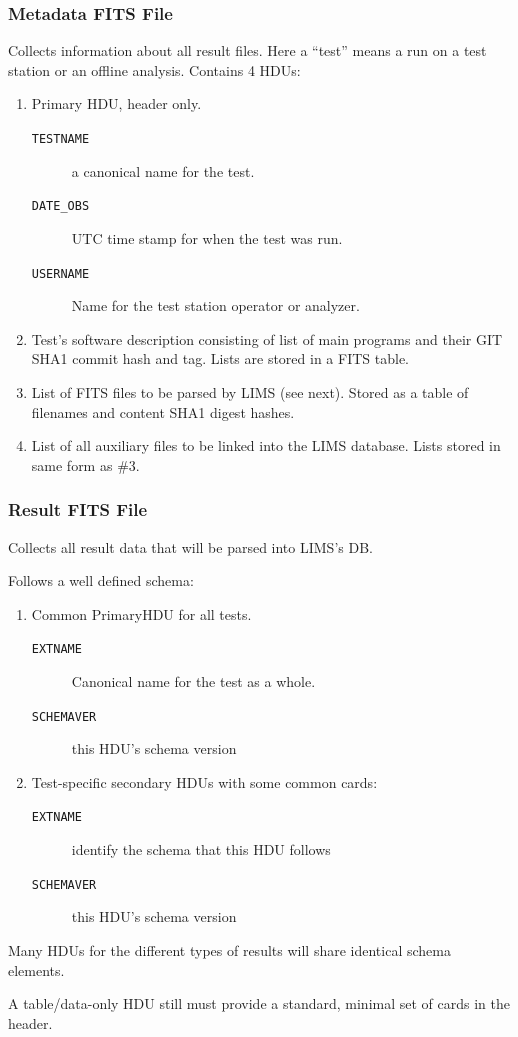 \documentclass[xcolor=dvipsnames]{beamer}
\begin{document}
\begin{frame}
  \frametitle{Metadata FITS File} 

  Collects information about all result files.  Here a ``test'' means
  a run on a test station or an offline analysis.  Contains 4 HDUs:

  \begin{enumerate}
  \item Primary HDU, header only.
    \begin{description}
    \item[\texttt{TESTNAME}] a canonical name for the test.
    \item[\texttt{DATE\_OBS}] UTC time stamp for when the test was run.
    \item[\texttt{USERNAME}] Name for the test station operator or analyzer.
    \end{description}
  \item Test's software description consisting of list of main
    programs and their GIT SHA1 commit hash and tag.  Lists are stored
    in a FITS table.
  \item List of FITS files to be parsed by LIMS (see next).  Stored as
    a table of filenames and content SHA1 digest hashes.
  \item List of all auxiliary files to be linked into the LIMS
    database.  Lists stored in same form as \#3.
  \end{enumerate}

\end{frame}


\begin{frame}
  \frametitle{Result FITS File}
  Collects all result data that will be parsed into LIMS's DB.

  \vspace{2mm}

  Follows a well defined schema:
  \begin{enumerate}
  \item Common PrimaryHDU for all tests.
    \begin{description}
    \item[\texttt{EXTNAME}] Canonical name for the test as a whole.
    \item[\texttt{SCHEMAVER}] this HDU's schema version
    \end{description}
  \item Test-specific secondary HDUs with some common cards:
    \begin{description}
    \item[\texttt{EXTNAME}] identify the schema that this HDU follows
    \item[\texttt{SCHEMAVER}] this HDU's schema version
    \end{description}
  \end{enumerate}

  \footnotesize

  Many HDUs for the different types of results will share identical schema elements.

  \vspace{2mm}

  A table/data-only HDU still must provide a standard, minimal set of
  cards in the header.
\end{frame}
\end{document}
